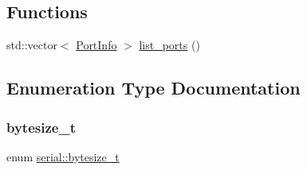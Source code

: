 \subsection*{Functions}
\begin{DoxyCompactItemize}
\item 
std\+::vector$<$ \mbox{\hyperlink{structserial_1_1_port_info}{Port\+Info}} $>$ \mbox{\hyperlink{namespaceserial_a8fa048a9e4663d6d6b474c1830491a57}{list\+\_\+ports}} ()
\end{DoxyCompactItemize}


\subsection{Enumeration Type Documentation}
\mbox{\label{namespaceserial_a00b3281fa11cea770c0b0c8a106080f8}} 
\subsubsection{\texorpdfstring{bytesize\+\_\+t}{bytesize\_t}}
{\footnotesize\ttfamily enum \mbox{\hyperlink{namespaceserial_a00b3281fa11cea770c0b0c8a106080f8}{serial\+::bytesize\+\_\+t}}}

